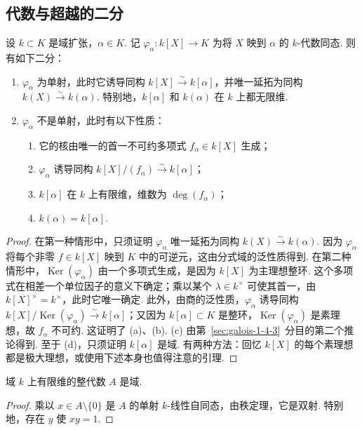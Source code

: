 \subsection{代数与超越的二分}\label{sec:galois-2-1-2}
\begin{proposition*}
设 $k\subset K$ 是域扩张，$\alpha\in K$. 记 $\varphi_\alpha:k[X]\longrightarrow K$ 为将 $X$ 映到 $\alpha$ 的 $k$-代数同态. 则有如下二分：
\begin{enumerate}[label=\roman*)]
\item $\varphi_\alpha$ 为单射，此时它诱导同构 $k[X]\xrightarrow{\sim}k[\alpha]$，并唯一延拓为同构 $k(X)\xrightarrow{\sim}k(\alpha)$. 特别地，$k[\alpha]$ 和 $k(\alpha)$ 在 $k$ 上都无限维.
\item $\varphi_\alpha$ 不是单射，此时有以下性质：
\begin{enumerate}[label=(\alph*)]
\item 它的核由唯一的首一不可约多项式 $f_\alpha\in k[X]$ 生成；
\item $\varphi_\alpha$ 诱导同构 $k[X]/(f_\alpha)\xrightarrow{\sim}k[\alpha]$；
\item $k[\alpha]$ 在 $k$ 上有限维，维数为 $\deg(f_\alpha)$；
\item $k(\alpha)=k[\alpha]$.
\end{enumerate}
\end{enumerate}
\end{proposition*}
\begin{proof}
在第一种情形中，只须证明 $\varphi_\alpha$ 唯一延拓为同构 $k(X)\xrightarrow{\sim}k(\alpha)$. 因为 $\varphi_\alpha$ 将每个非零 $f\in k[X]$ 映到 $K$ 中的可逆元，这由分式域的泛性质得到.
在第二种情形中，$\operatorname{Ker}(\varphi_\alpha)$ 由一个多项式生成，是因为 $k[X]$ 为主理想整环. 这个多项式在相差一个单位因子的意义下确定；乘以某个 $\lambda\in k^\times$ 可使其首一，由 $k[X]^\times=k^\times$，此时它唯一确定. 此外，由商的泛性质，$\varphi_\alpha$ 诱导同构 $k[X]/\operatorname{Ker}(\varphi_\alpha)\xrightarrow{\sim}k[\alpha]$；又因为 $k[\alpha]\subset K$ 是整环，$\operatorname{Ker}(\varphi_\alpha)$ 是素理想，故 $f_\alpha$ 不可约. 这证明了 (a)、(b). (c) 由第~\ref{sec:galois-1-4-3}~分目的第二个推论得到. 至于 (d)，只须证明 $k[\alpha]$ 是域. 有两种方法：回忆 $k[X]$ 的每个素理想都是极大理想，或使用下述本身也值得注意的引理.
\end{proof}
\begin{lemma*}
域 $k$ 上有限维的整代数 $A$ 是域.
\end{lemma*}
\begin{proof}
乘以 $x\in A\setminus\{0\}$ 是 $A$ 的单射 $k$-线性自同态，由秩定理，它是双射. 特别地，存在 $y$ 使 $xy=1$.
\end{proof}
